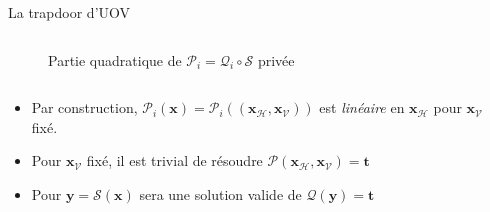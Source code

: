 \begin{frame}{La trapdoor d'UOV}
\begin{columns}
\begin{figure}
            \captionsetup{labelformat=empty} %
            \caption{Partie quadratique de $\mathcal{P}_i=\mathcal{Q}_i\circ \mathcal{S}$ privée}
            \end{figure}
    \end{columns}
    \pause
    \begin{itemize}
        \item Par construction, $\mathcal{P}_i(\mathbf{x})=\mathcal{P}_i((\mathbf{x}_\mathcal{H},\mathbf{x}_\mathcal{V}))$ est \textit{linéaire} en $\mathbf{x}_\mathcal{H}$ pour $\mathbf{x}_\mathcal{V}$ fixé.
        \pause
        \item Pour $\mathbf{x}_\mathcal{V}$ fixé, il est trivial de résoudre $\mathcal{P}(\mathbf{x}_\mathcal{H},\mathbf{x}_\mathcal{V})=\mathbf{t}$
        \pause
        \item Pour $\mathbf{y}=\mathcal{S}(\mathbf{x})$ sera une solution valide de $\mathcal{Q}(\mathbf{y}) =\mathbf{t}$
    \end{itemize}
    
\end{frame}

